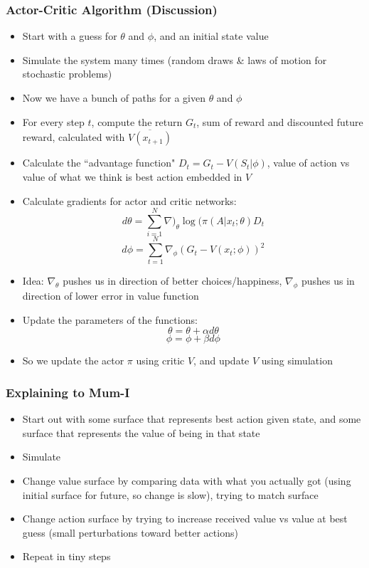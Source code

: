 \documentclass{beamer}
\begin{document}
\begin{frame}
\frametitle[alignment=center]{Actor-Critic Algorithm (Discussion)}
\begin{itemize}
\footnotesize
\item Start with a guess for $\theta$ and $\phi$, and an initial state value
\item Simulate the system many times (random draws \& laws of motion for stochastic problems)
\item Now we have a bunch of paths for a given $\theta$ and $\phi$
\item For every step $t$, compute the return $G_t$, sum of reward and discounted future reward, calculated with $\overline{V(x_{t+1})}$
\item Calculate the ``advantage function" $D_t=G_t-V(S_t|\phi)$, value of action vs value of what we think is best action embedded in $V$
\item Calculate gradients for actor and critic networks: 
$$d\theta=\sum_{i=1}^N\nabla)_{\theta}\log(\pi(A|x_t;\theta)D_t$$
$$d\phi=\sum_{t=1}^N\nabla_{\phi}(G_t-V(x_t;\phi))^2$$
\item Idea:  $\nabla_{\theta}$ pushes us in direction of better choices/happiness, $\nabla_{\phi}$ pushes us in direction of lower error in value function
\item Update the parameters of the functions:
$$\theta=\theta+\alpha d\theta$$
$$\phi=\phi+\beta d\phi$$
\item So we update the actor $\pi$ using critic $V$, and update $V$ using simulation
\end{itemize}
\end{frame}

\begin{frame}
\frametitle[alignment=center]{Explaining to Mum-I}
\begin{itemize}
\item Start out with some surface that represents best action given state, and some surface that represents the value of being in that state
\bigskip
\item Simulate
\bigskip
\item Change value surface by comparing data with what you actually got (using initial surface for future, so change is slow), trying to match surface
\bigskip
\item Change action surface by trying to  increase received value vs value at best guess (small perturbations toward better actions)
\bigskip
\item Repeat in tiny steps
\end{itemize}
\end{frame}
\end{document}
